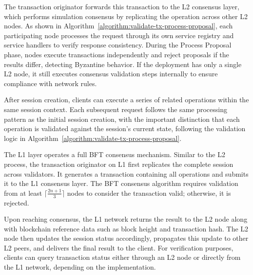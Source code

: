 \documentclass[conference]{IEEEtran}
\begin{document}
The transaction originator forwards this transaction to the L2 consensus layer, which performs simulation consensus by replicating the operation across other L2 nodes. As shown in Algorithm~\ref{algorithm:validate-tx-process-proposal}, each participating node processes the request through its own service registry and service handlers to verify response consistency. During the Process Proposal phase, nodes execute transactions independently and reject proposals if the results differ, detecting Byzantine behavior. If the deployment has only a single L2 node, it still executes consensus validation steps internally to ensure compliance with network rules.


After session creation, clients can execute a series of related operations within the same session context. Each subsequent request follows the same processing pattern as the initial session creation, with the important distinction that each operation is validated against the session's current state, following the validation logic in Algorithm~\ref{algorithm:validate-tx-process-proposal}.

The L1 layer operates a full BFT consensus mechanism. Similar to the L2 process, the transaction originator on L1 first replicates the complete session across validators. It generates a transaction containing all operations and submits it to the L1 consensus layer. The BFT consensus algorithm requires validation from at least $\lceil \frac{2n+1}{3} \rceil$ nodes to consider the transaction valid; otherwise, it is rejected.

Upon reaching consensus, the L1 network returns the result to the L2 node along with blockchain reference data such as block height and transaction hash. The L2 node then updates the session status accordingly, propagates this update to other L2 peers, and delivers the final result to the client. For verification purposes, clients can query transaction status either through an L2 node or directly from the L1 network, depending on the implementation.
\end{document}
